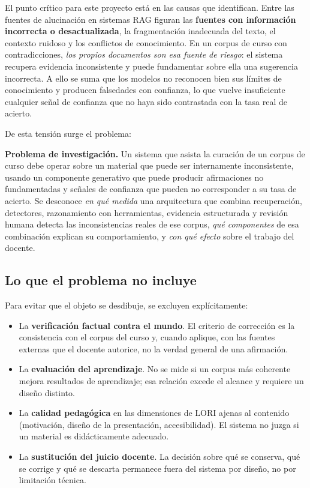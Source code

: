 El punto crítico para este proyecto está en las causas que identifican. Entre las
fuentes de alucinación en sistemas RAG figuran las \textbf{fuentes con información
incorrecta o desactualizada}, la fragmentación inadecuada del texto, el contexto
ruidoso y los conflictos de conocimiento. En un corpus de curso con contradicciones,
\emph{los propios documentos son esa fuente de riesgo}: el sistema recupera evidencia
inconsistente y puede fundamentar sobre ella una sugerencia incorrecta. A ello se
suma que los modelos no reconocen bien sus límites de conocimiento y producen
falsedades con confianza, lo que vuelve insuficiente cualquier señal de confianza que
no haya sido contrastada con la tasa real de acierto.

De esta tensión surge el problema:

\begin{estado}[colframe=ecAzul]
\small
\textbf{Problema de investigación.} Un sistema que asista la curación de un corpus
de curso debe operar sobre un material que puede ser internamente inconsistente,
usando un componente generativo que puede producir afirmaciones no fundamentadas y
señales de confianza que pueden no corresponder a su tasa de acierto. Se desconoce
\emph{en qué medida} una arquitectura que combina recuperación, detectores,
razonamiento con herramientas, evidencia estructurada y revisión humana detecta las
inconsistencias reales de ese corpus, \emph{qué componentes} de esa combinación
explican su comportamiento, y \emph{con qué efecto} sobre el trabajo del docente.
\end{estado}

\subsection{Lo que el problema no incluye}
\label{sec:problema-exclusiones}

Para evitar que el objeto se desdibuje, se excluyen explícitamente:

\begin{itemize}
  \item La \textbf{verificación factual contra el mundo}. El criterio de corrección
        es la consistencia con el corpus del curso y, cuando aplique, con las fuentes
        externas que el docente autorice, no la verdad general de una afirmación.
  \item La \textbf{evaluación del aprendizaje}. No se mide si un corpus más
        coherente mejora resultados de aprendizaje; esa relación excede el alcance y
        requiere un diseño distinto.
  \item La \textbf{calidad pedagógica} en las dimensiones de LORI ajenas al
        contenido (motivación, diseño de la presentación, accesibilidad). El sistema
        no juzga si un material es didácticamente adecuado.
  \item La \textbf{sustitución del juicio docente}. La decisión sobre qué se
        conserva, qué se corrige y qué se descarta permanece fuera del sistema por
        diseño, no por limitación técnica.
\end{itemize}
